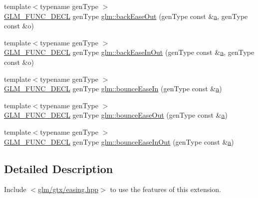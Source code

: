 \begin{DoxyCompactItemize}
\item 
{\footnotesize template$<$typename gen\+Type $>$ }\\\mbox{\hyperlink{setup_8hpp_ab2d052de21a70539923e9bcbf6e83a51}{G\+L\+M\+\_\+\+F\+U\+N\+C\+\_\+\+D\+E\+CL}} gen\+Type \mbox{\hyperlink{group__gtx__easing_ga640c1ac6fe9d277a197da69daf60ee4f}{glm\+::back\+Ease\+Out}} (gen\+Type const \&\mbox{\hyperlink{_s_d_l__opengl__glext_8h_a3309789fc188587d666cda5ece79cf82}{a}}, gen\+Type const \&o)
\item 
{\footnotesize template$<$typename gen\+Type $>$ }\\\mbox{\hyperlink{setup_8hpp_ab2d052de21a70539923e9bcbf6e83a51}{G\+L\+M\+\_\+\+F\+U\+N\+C\+\_\+\+D\+E\+CL}} gen\+Type \mbox{\hyperlink{group__gtx__easing_ga68a7b760f2afdfab298d5cd6d7611fb1}{glm\+::back\+Ease\+In\+Out}} (gen\+Type const \&\mbox{\hyperlink{_s_d_l__opengl__glext_8h_a3309789fc188587d666cda5ece79cf82}{a}}, gen\+Type const \&o)
\item 
{\footnotesize template$<$typename gen\+Type $>$ }\\\mbox{\hyperlink{setup_8hpp_ab2d052de21a70539923e9bcbf6e83a51}{G\+L\+M\+\_\+\+F\+U\+N\+C\+\_\+\+D\+E\+CL}} gen\+Type \mbox{\hyperlink{group__gtx__easing_gaac30767f2e430b0c3fc859a4d59c7b5b}{glm\+::bounce\+Ease\+In}} (gen\+Type const \&\mbox{\hyperlink{_s_d_l__opengl__glext_8h_a3309789fc188587d666cda5ece79cf82}{a}})
\item 
{\footnotesize template$<$typename gen\+Type $>$ }\\\mbox{\hyperlink{setup_8hpp_ab2d052de21a70539923e9bcbf6e83a51}{G\+L\+M\+\_\+\+F\+U\+N\+C\+\_\+\+D\+E\+CL}} gen\+Type \mbox{\hyperlink{group__gtx__easing_ga94007005ff0dcfa0749ebfa2aec540b2}{glm\+::bounce\+Ease\+Out}} (gen\+Type const \&\mbox{\hyperlink{_s_d_l__opengl__glext_8h_a3309789fc188587d666cda5ece79cf82}{a}})
\item 
{\footnotesize template$<$typename gen\+Type $>$ }\\\mbox{\hyperlink{setup_8hpp_ab2d052de21a70539923e9bcbf6e83a51}{G\+L\+M\+\_\+\+F\+U\+N\+C\+\_\+\+D\+E\+CL}} gen\+Type \mbox{\hyperlink{group__gtx__easing_gadf9f38eff1e5f4c2fa5b629a25ae413e}{glm\+::bounce\+Ease\+In\+Out}} (gen\+Type const \&\mbox{\hyperlink{_s_d_l__opengl__glext_8h_a3309789fc188587d666cda5ece79cf82}{a}})
\end{DoxyCompactItemize}


\subsection{Detailed Description}
Include $<$\mbox{\hyperlink{easing_8hpp}{glm/gtx/easing.\+hpp}}$>$ to use the features of this extension.

